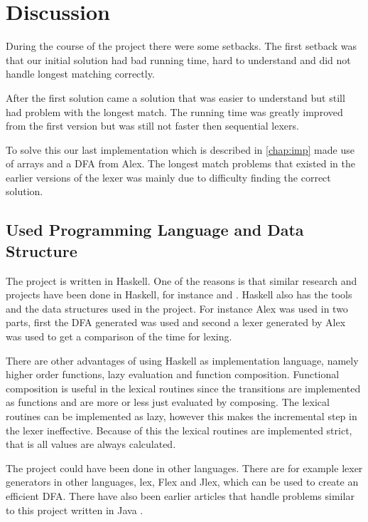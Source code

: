 \chapter{Discussion \label{chap:disc}}
During the course of the project there were some setbacks. The first setback
was that our initial solution had bad running time, hard to understand and did
not handle longest matching correctly.

After the first solution came a solution
that was easier to understand but still had problem with the longest match. The
running time was greatly improved from the first version but was still not
faster then sequential lexers.

To solve this our last implementation which is
described in \cref{chap:imp} made use of arrays and a DFA from
Alex. The longest match problems that existed in the earlier versions of the
lexer was mainly due to difficulty finding the correct solution.

\section{Used Programming Language and Data Structure}
The project is written in Haskell. One of the reasons is that similar
research and projects have been done in Haskell, for instance \cite{blog} and \cite{fingertree}.
Haskell also has the tools and the data structures used in the project. For
instance Alex was used in two parts, first the DFA generated was used and second
a lexer generated by Alex was used to get a comparison of the time for lexing.

There are other advantages of using Haskell as implementation language, namely
higher order functions, lazy evaluation and function composition. Functional
composition is useful in the lexical routines since the transitions are
implemented as functions and are more or less just evaluated by composing.
The lexical routines can be implemented as lazy, however this makes the
incremental step in the lexer ineffective. Because of this the lexical routines
are implemented strict, that is all values are always calculated.

The project could have been done in other languages. There are for example
lexer generators in other languages, lex, Flex and Jlex, which can be used to
create an efficient DFA. There have also been earlier articles that handle
problems similar to this project written in Java \cite{JavaIncRegExp}.

